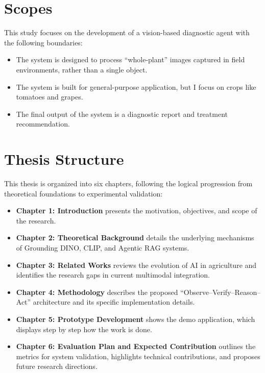 \section{Scopes}
This study focuses on the development of a vision-based diagnostic agent with the following boundaries: \begin{itemize} 
	\item The system is designed to process ``whole-plant'' images captured in field environments, rather than a single object. 
	\item The system is built for general-purpose application, but I focus on crops like tomatoes and grapes. 
	\item The final output of the system is a diagnostic report and treatment recommendation.
\end{itemize}

\section{Thesis Structure}
This thesis is organized into six chapters, following the logical progression from theoretical foundations to experimental validation: 
\begin{itemize} 
	\item \textbf{Chapter 1: Introduction} presents the motivation, objectives, and scope of the research. 
	\item \textbf{Chapter 2: Theoretical Background} details the underlying mechanisms of Grounding DINO, CLIP, and Agentic RAG systems. 
	\item \textbf{Chapter 3: Related Works} reviews the evolution of AI in agriculture and identifies the research gaps in current multimodal integration. 
	\item \textbf{Chapter 4: Methodology} describes the proposed ``Observe--Verify--Reason--Act'' architecture and its specific implementation details. 
	\item \textbf{Chapter 5: Prototype Development} shows the demo application, which displays step by step how the work is done.
	\item \textbf{Chapter 6: Evaluation Plan and Expected Contribution} outlines the metrics for system validation, highlights technical contributions, and proposes future research directions. 
\end{itemize}